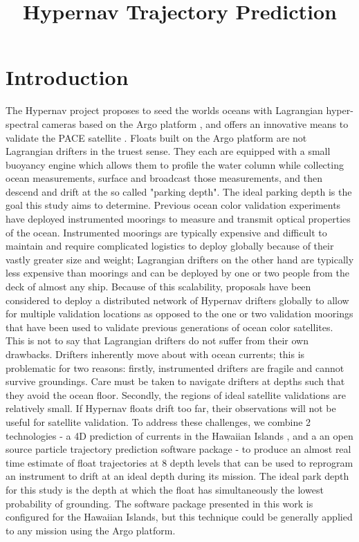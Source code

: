 \documentclass{ametsocV5}
\title{Hypernav Trajectory Prediction}
\affiliation{Scripps Institution of Oceanography, 
La Jolla, California}
\begin{document}
\maketitle
\section{Introduction}
The Hypernav project proposes to seed the worlds oceans with Lagrangian hyper-spectral cameras based on the Argo platform \citep{roemmich2019future}, and offers an innovative means to validate the PACE satellite \citep{frouin2019atmospheric}. Floats built on the Argo platform are not Lagrangian drifters in the truest sense. They each are equipped with a small buoyancy engine which allows them to profile the water column while collecting ocean measurements, surface and broadcast those measurements, and then descend and drift at the so called "parking depth". The ideal parking depth is the goal this study aims to determine. Previous ocean color validation experiments have deployed instrumented moorings \citep{clark2003moby} to measure and transmit optical properties of the ocean. Instrumented moorings are typically expensive and difficult to maintain and require complicated logistics to deploy globally because of their vastly greater size and weight; Lagrangian drifters on the other hand are typically less expensive than moorings and can be deployed by one or two people from the deck of almost any ship. Because of this scalability, proposals have been considered to deploy a distributed network of Hypernav drifters globally to allow for multiple validation locations as opposed to the one or two validation moorings that have been used to validate previous generations of ocean color satellites. This is not to say that Lagrangian drifters do not suffer from their own drawbacks. Drifters inherently move about with ocean currents; this is problematic for two reasons: firstly, instrumented drifters are fragile and cannot survive groundings. Care must be taken to navigate drifters at depths such that they avoid the ocean floor. Secondly, the regions of ideal satellite validations are relatively small. If Hypernav floats drift too far, their observations will not be useful for satellite validation. To address these challenges, we combine 2 technologies - a 4D prediction of currents in the Hawaiian Islands \citep{PacIOOS}, and a an open source particle trajectory prediction software package \citep{delandmeter2019parcels} - to produce an almost real time estimate of float trajectories at 8 depth levels that can be used to reprogram an instrument to drift at an ideal depth during its mission. The ideal park depth for this study is the depth at which the float has simultaneously the lowest probability of grounding. The software package presented in this work is configured for the Hawaiian Islands, but this technique could be generally applied to any mission using the Argo platform.
\end{document}
